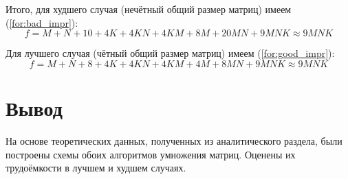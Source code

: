 Итого, для худшего случая (нечётный общий размер матриц) имеем (\ref{for:bad_impr}):
\begin{equation}
    \label{for:bad_impr}
    f = M + N + 10 + 4K + 4KN + 4KM + 8M + 20MN + 9MNK \approx 9MNK
\end{equation}

Для лучшего случая (чётный общий размер матриц) имеем (\ref{for:good_impr}):
\begin{equation}
    \label{for:good_impr}
    f = M + N + 8 + 4K +4KN + 4KM + 4M + 8MN + 9MNK \approx 9MNK
\end{equation}


\section*{Вывод}

На основе теоретических данных, полученных из аналитического раздела, были построены схемы обоих алгоритмов умножения матриц.  Оценены их трудоёмкости в лучшем и худшем случаях.
